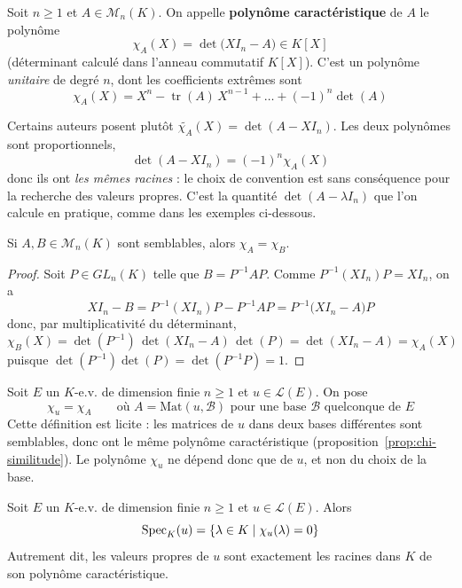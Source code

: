 \begin{defi}
\label{defi:poly-caracteristique}
Soit $n\geq 1$ et $A\in\mathcal{M}_n(K)$. On appelle \textbf{polynôme caractéristique} de $A$ le polynôme
\[\chi_A(X) = \det\big(X I_n - A\big) \in K[X]\]
(déterminant calculé dans l'anneau commutatif $K[X]$). C'est un polynôme \emph{unitaire} de degré $n$, dont les coefficients extrêmes sont
\[\chi_A(X) = X^n - \operatorname{tr}(A)\,X^{n-1} + \dots + (-1)^n\det(A)\]
\end{defi}

\begin{remarque}[Convention]
Certains auteurs posent plutôt $\widetilde{\chi_A}(X) = \det(A-X I_n)$. Les deux polynômes sont proportionnels,
\[\det(A - X I_n) = (-1)^n \chi_A(X)\]
donc ils ont \emph{les mêmes racines} : le choix de convention est sans conséquence pour la recherche des valeurs propres. C'est la quantité $\det(A-\lambda I_n)$ que l'on calcule en pratique, comme dans les exemples ci-dessous.
\end{remarque}

\begin{prop}
\label{prop:chi-similitude}
Si $A,B\in\mathcal{M}_n(K)$ sont semblables, alors $\chi_A=\chi_B$.
\end{prop}

\begin{proof}
Soit $P\in GL_n(K)$ telle que $B=P^{-1}AP$. Comme $P^{-1}(X I_n)P = X I_n$, on a
\[X I_n - B = P^{-1}(X I_n)P - P^{-1}AP = P^{-1}\big(X I_n-A\big)P\]
donc, par multiplicativité du déterminant,
\[\chi_B(X) = \det(P^{-1})\,\det(X I_n-A)\,\det(P) = \det(X I_n - A) = \chi_A(X)\]
puisque $\det(P^{-1})\det(P)=\det(P^{-1}P)=1$.
\end{proof}

\begin{defi}
\label{defi:chi-endo}
Soit $E$ un $K$-e.v. de dimension finie $n\geq 1$ et $u\in\mathcal{L}(E)$. On pose
\[\chi_u = \chi_A \qquad \text{où } A=\mathrm{Mat}(u,\mathcal{B}) \text{ pour une base } \mathcal{B} \text{ quelconque de } E\]
Cette définition est licite : les matrices de $u$ dans deux bases différentes sont semblables, donc ont le même polynôme caractéristique (proposition~\ref{prop:chi-similitude}). Le polynôme $\chi_u$ ne dépend donc que de $u$, et non du choix de la base.
\end{defi}

\begin{prop}
\label{prop:spec-racines-chi}
Soit $E$ un $K$-e.v. de dimension finie $n\geq 1$ et $u\in\mathcal{L}(E)$. Alors
\[\operatorname{Spec}_K(u) = \{\lambda\in K \mid \chi_u(\lambda)=0\}\]
Autrement dit, les valeurs propres de $u$ sont exactement les racines dans $K$ de son polynôme caractéristique.
\end{prop}

